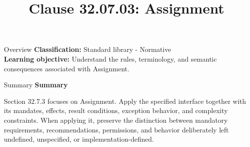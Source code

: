\documentclass[10pt,letterpaper]{article}
\title{Clause 32.07.03: Assignment}
\author{}
\date{}
\begin{document}
\maketitle
\begin{CornellOverviewBox}{Overview}
\textbf{Classification:} Standard library - Normative\\[2pt]
\textbf{Learning objective:} Understand the rules, terminology, and semantic consequences associated with Assignment.
\end{CornellOverviewBox}\begin{CornellSummaryBox}{Summary}
{\sffamily\bfseries\color{Accent} Summary}\par\vspace{3pt}Section 32.7.3 focuses on Assignment. Apply the specified interface together with its mandates, effects, result conditions, exception behavior, and complexity constraints. When applying it, preserve the distinction between mandatory requirements, recommendations, permissions, and behavior deliberately left undefined, unspecified, or implementation-defined.
\end{CornellSummaryBox}
\end{document}
